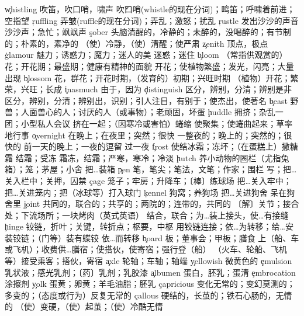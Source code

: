 \begin{multicols}{2}
\c{whistling}  \n 吹笛，吹口哨，啸声 \v 吹口哨(whistle的现在分词)；鸣笛；呼啸着前进；空指望
\c{ruffling}  \v 弄皱(ruffle的现在分词)；弄乱；激怒；扰乱
\c{rustle}  \v 发出沙沙的声音 \n 沙沙声；急忙；飒飒声
\c{sober}  \a 头脑清醒的，冷静的；未醉的，没喝醉的；有节制的；朴素的，素净的 \v （使）冷静，（使）清醒；使严肃
\c{zenith}  \n 顶点，极点
\c{glamour}  \n 魅力；诱惑力；魔力；迷人的美 \v 迷惑；迷住
\c{bloom}  \n （常指供观赏的）花；开花期；最盛期；健康有精神的面貌 \vi 开花；使植物繁盛；发光，闪亮；大量出现
\c{blossom}  \n 花，群花；开花时期，（发育的）初期；兴旺时期 \vi （植物）开花；繁荣，兴旺；长成
\c{inasmuch}  \ad 由于，因为
\c{distinguish}  \vi 区分，辨别，分清；辨别是非 \vt 区分，辨别，分清；辨别出，识别；引人注目，有别于；使杰出，使著名
\c{beast}  \n 野兽；人面兽心的人；讨厌的人（或事物）；老顽固，坏蛋
\c{huddle}  \n 拥挤；杂乱一团；小型私人会议 \vi 挤在一起；（因寒冷或害怕）蜷缩 \vt 使聚集；使蜷曲起来；草率地行事
\c{overnight}  \ad 在晚上；在夜里；突然；很快 \a 一整夜的；晚上的；突然的；很快的 \n 前一天的晚上；一夜的逗留 \vi 过一夜
\c{frost}  \v 使结冰霜；冻坏；（在蛋糕上）撒糖霜 \vi 结霜；受冻 \n 霜冻，结霜；严寒，寒冷；冷淡
\c{hutch}  \n 养小动物的圈栏（尤指兔箱）；笼；茅屋；小舍 \vt 把…装箱
\c{pen}  \n 笔，笔尖；笔法，文笔；作家；围栏 \vt 写；把…关入栏中；关押，囚禁
\c{cage}  \n 笼子；牢房；升降车；〔棒〕练球场 \vt 把…关入牢中；把…关进笼内；把（冰球等）打入球门
\c{kennel}  \n 狗窝；养狗场 \vt 把…关进狗舍 \vi 呆在狗舍里
\c{joint}  \a 共同的，联合的；共享的；两院的；连带的，共同的 \n 〔解〕关节；接合处；下流场所；一块烤肉（英式英语） \vt 结合，联合；为…装上接头，使…有接缝
\c{hinge}  \n 铰链，折叶；关键，转折点；枢要，中枢 \v 用铰链连接；依…为转移；给…安装铰链；（门等）装有蝶铰 \vi 依…而转移
\c{board}  \n 板；董事会；甲板；膳食 \vt 上（船、车或飞机）；收费供…膳宿；使搭伙，使寄宿；强行登（船） \vi （火车、轮船、飞机等）接受乘客；搭伙，寄宿
\c{axle}  \n 轮轴；车轴；轴端
\c{yellowish}  \a 微黄色的
\c{emulsion}  \n 乳状液；感光乳剂；〔药〕乳剂；乳胶漆
\c{albumen}  \n 蛋白，胚乳；蛋清
\c{embrocation}  \n 涂擦剂
\c{yolk}  \n 蛋黄；卵黄；羊毛油脂；胚乳
\c{capricious}  \a 变化无常的；变幻莫测的；多变的；（态度或行为）反复无常的
\c{callous}  \a 硬结的，长茧的；铁石心肠的，无情的 \vt （使）变硬，（使）起茧；（使）冷酷无情

\end{multicols}
